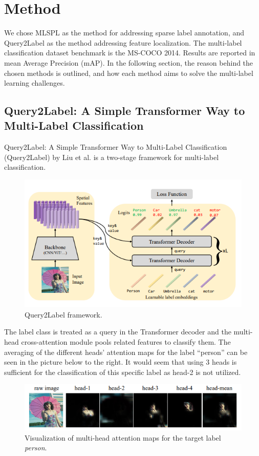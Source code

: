 \documentclass[lettersize,journal]{IEEEtran}
\begin{document}

\section{Method}
We chose MLSPL as the method for addressing sparse label annotation, and Query2Label as the method addressing feature localization. The multi-label classification dataset benchmark is the MS-COCO 2014. Results are reported in mean Average Precision (mAP). In the following section, the reason behind the chosen methods is outlined, and how each method aims to solve the multi-label learning challenges.


\subsection{Query2Label: A Simple Transformer Way to Multi-Label Classification}
\label{sec:q2l_method}
Query2Label: A Simple Transformer Way to Multi-Label Classification (Query2Label) by Liu et al. \cite{Query2Label} is a two-stage framework for multi-label classification. 

\begin{figure}[t]
    \centering
    \includegraphics[width=.8\linewidth]{images/q2l_framework.PNG}
    \caption{Query2Label framework.}
    \label{fig:q2l_framework}
\end{figure}

The label class is treated as a query in the Transformer decoder and the multi-head cross-attention module pools related features to classify them. The averaging of the different heads' attention maps for the label “person” can be seen in the picture below to the right. It would seem that using 3 heads is sufficient for the classification of this specific label as head-2 is not utilized. 

\begin{figure}[t]
    \centering
    \includegraphics[width=.8\linewidth]{images/q2l_mha.PNG}
    \caption{Visualization of multi-head attention maps for the target label \textit{person}.}
    \label{fig:q2l_mha}
\end{figure}
\end{document}

